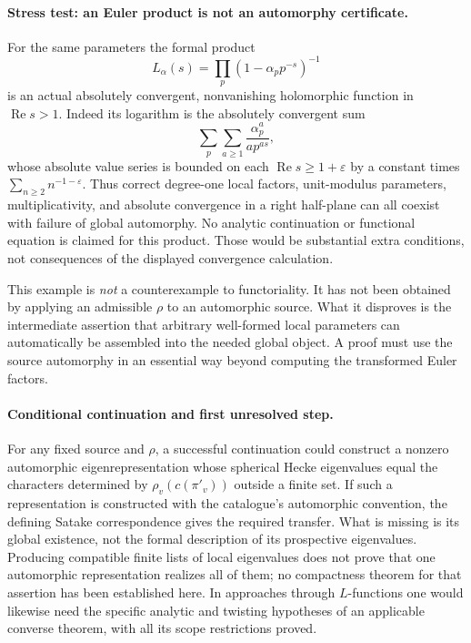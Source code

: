 \documentclass[11pt]{article}
\begin{document}
\paragraph{Stress test: an Euler product is not an automorphy certificate.}
For the same parameters the formal product
\[
 L_\alpha(s)=\prod_p(1-\alpha_pp^{-s})^{-1}
\]
is an actual absolutely convergent, nonvanishing holomorphic function
in $\operatorname{Re}s>1$. Indeed its logarithm is the absolutely
convergent sum
\[
 \sum_p\sum_{a\ge1}\frac{\alpha_p^a}{a p^{as}},
\]
whose absolute value series is bounded on each
$\operatorname{Re}s\ge1+\varepsilon$ by a constant times
$\sum_{n\ge2}n^{-1-\varepsilon}$.
Thus correct degree-one local factors, unit-modulus parameters,
multiplicativity, and absolute convergence in a right half-plane can
all coexist with failure of global automorphy. No analytic
continuation or functional equation is claimed for this product.
Those would be substantial extra conditions, not consequences of
the displayed convergence calculation.

This example is \emph{not} a counterexample to functoriality. It has
not been obtained by applying an admissible $\rho$ to an automorphic
source. What it disproves is the intermediate assertion that arbitrary
well-formed local parameters can automatically be assembled into the
needed global object. A proof must use the source automorphy in an
essential way beyond computing the transformed Euler factors.

\paragraph{Conditional continuation and first unresolved step.}
For any fixed source and $\rho$, a successful continuation could
construct a nonzero automorphic eigenrepresentation whose spherical
Hecke eigenvalues equal the characters determined by
$\rho_v(c(\pi'_v))$ outside a finite set. If such a representation is
constructed with the catalogue's automorphic convention, the defining
Satake correspondence gives the required transfer. What is missing is
its global existence, not the formal description of its prospective
eigenvalues. Producing compatible finite lists of local eigenvalues
does not prove that one automorphic representation realizes all of
them; no compactness theorem for that assertion has been established
here. In approaches through $L$-functions one would likewise need the
specific analytic and twisting hypotheses of an applicable converse
theorem, with all its scope restrictions proved.
\end{document}

